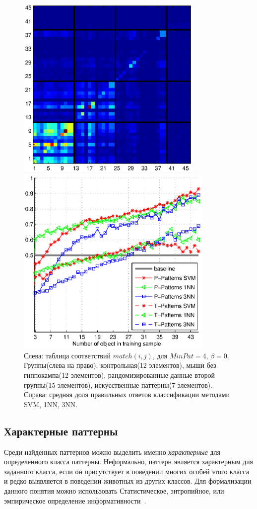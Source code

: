 \documentclass[12pt,fсeqn]{article}
\begin{document}
\begin{figure}[!t]
	\begin{multicols}{2}
	\hfill
	\includegraphics[width=90mm]{4classes_match.eps}

	\includegraphics[width=95mm]{4classes.eps}
	\end{multicols}
	\caption{ Слева: таблица соответствий $match(i,j)$, для $MinPat=4$, $\beta=0$. Группы(слева на право): контрольная(12 элементов),
мыши без гиппокампа(12 элементов), рандомизированные данные второй группы(15 элементов), искусственные паттерны(7 элементов).
Справа: средняя доля правильных ответов классификации методами SVM, 1NN, 3NN. }
\label{fig:4classes}
\end{figure}

\subsection{Характерные паттерны}
Среди найденных паттернов можно выделить именно \emph{характерные} для определенного
класса паттерны. Неформально, паттерн является характерным для заданного класса, 
если он присутствует в поведении многих особей этого класса и редко выявляется в поведении 
животных из других классов. Для формализации данного понятия можно использовать 
Статистическое, энтропийное, или эмпирическое определение информативности~\cite{Voron_Logic}.
\end{document}
